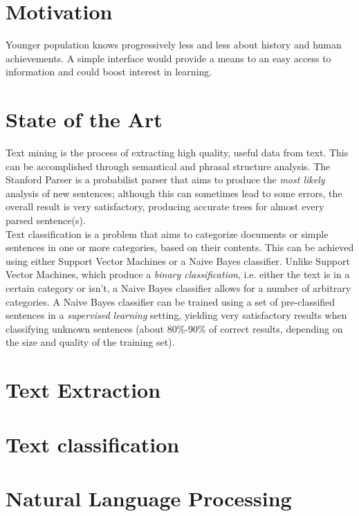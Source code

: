 \documentclass{llncs}
\begin{document}
\section{Motivation}

Younger population knows progressively less and less about history and human achievements. A simple interface would provide a means to an easy access to information and could boost interest in learning.\\

\section{State of the Art}

Text mining is the process of extracting high quality, useful data from text. This can be accomplished through semantical and phrasal structure analysis. The Stanford Parser is a probabilist parser that aims to produce the \textit{most likely} analysis of new sentences; although this can sometimes lead to some errors, the overall result is very satisfactory, producing accurate trees for almost every parsed sentence(s).\\

Text classification is a problem that aims to categorize documents or simple sentences in one or more categories, based on their contents. This can be achieved using either Support Vector Machines or a Naive Bayes classifier. Unlike Support Vector Machines, which produce a \textit{binary classification}, i.e. either the text is in a certain category or isn't, a Naive Bayes classifier allows for a number of arbitrary categories. A Naive Bayes classifier can be trained using a set of pre-classified sentences in a \textit{supervised learning} setting, yielding very satisfactory results when classifying unknown sentences (about 80\%-90\% of correct results, depending on the size and quality of the training set).

\section{Text Extraction}

\section{Text classification}

\section{Natural Language Processing}
\end{document}
